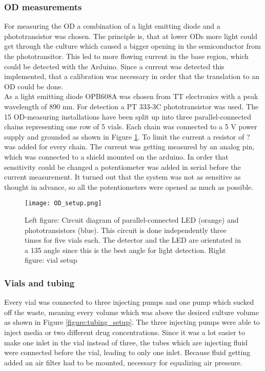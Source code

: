\subsubsection{OD measurements}
For measuring the OD a combination of a light emitting diode and a phototransistor was chosen. The principle is, that at lower ODs more light could get through the culture which caused a bigger opening in the semiconductor from the phototransitor. This led to more flowing current in the base region, which could be detected with the Arduino. Since a current was detected this implemented, that a calibration was necessary in order that the translation to an OD could be done.\\
As a light emitting diode OPB608A was chosen from TT electronics with a peak wavelength of 890 nm. For detection a PT 333-3C phototransistor was used. The 15 OD-measuring installations have been split up into three parallel-connected chains representing one row of 5 vials. Each chain was connected to a 5 V power supply and grounded as shown in Figure \ref{figure:OD_cirguit}. To limit the current a resistor of ? \textOmega \space was added for every chain. The current was getting measured by an analog pin, which was connected to a shield mounted on the arduino. In order that sensitivity could be changed a potentiometer was added in serial before the current measurement. It turned out that the system was not as sensitive as thought in advance, so all the potentiometers were opened as much as possible.   

\begin{figure}
	\texttt{[image: OD\_setup.png]}
	\caption{Left figure: Circuit diagram of parallel-connected LED (orange) and phototransistors (blue). This circuit is done independently three times for five vials each. The detector and the LED are orientated in a 135 \degree  angle since this is the best angle for light detection. Right figure: vial setup}
	\label{figure:OD_cirguit}
\end{figure}

\subsubsection{Vials and tubing}
Every vial was connected to three injecting pumps and one pump which sucked off the waste, meaning every volume which was above the desired culture volume as shown in Figure \ref{figure:tubing_setup}. The three injecting pumps were able to inject media or two different drug concentrations. Since it was a lot easier to make one inlet in the vial instead of three, the tubes which are injecting fluid were connected before the vial, leading to only one inlet. Because fluid getting added an air filter had to be mounted, necessary for equalizing air pressure.   

